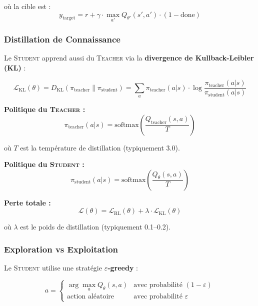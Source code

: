 \documentclass[12pt,a4paper]{article}
\newcommand{\teacher}{\textsc{Teacher}}
\newcommand{\student}{\textsc{Student}}
\begin{document}
où la cible est :
\begin{equation}
y_{\text{target}} = r + \gamma \cdot \max_{a'} Q_{\theta'}(s', a') \cdot (1 - \text{done})
\end{equation}

\subsubsection{Distillation de Connaissance}

Le \student{} apprend aussi du \teacher{} via la \textbf{divergence de Kullback-Leibler (KL)} :

\begin{equation}
\mathcal{L}_{\text{KL}}(\theta) = D_{\text{KL}}(\pi_{\text{teacher}} \| \pi_{\text{student}}) = \sum_a \pi_{\text{teacher}}(a|s) \cdot \log\frac{\pi_{\text{teacher}}(a|s)}{\pi_{\text{student}}(a|s)}
\end{equation}

\textbf{Politique du \teacher{} :}
\begin{equation}
\pi_{\text{teacher}}(a|s) = \text{softmax}\left(\frac{Q_{\text{teacher}}(s, a)}{T}\right)
\end{equation}

où $T$ est la température de distillation (typiquement 3.0).

\textbf{Politique du \student{} :}
\begin{equation}
\pi_{\text{student}}(a|s) = \text{softmax}\left(\frac{Q_\theta(s, a)}{T}\right)
\end{equation}

\textbf{Perte totale :}
\begin{equation}
\mathcal{L}(\theta) = \mathcal{L}_{\text{RL}}(\theta) + \lambda \cdot \mathcal{L}_{\text{KL}}(\theta)
\end{equation}

où $\lambda$ est le poids de distillation (typiquement 0.1--0.2).

\subsubsection{Exploration vs Exploitation}

Le \student{} utilise une stratégie \textbf{$\varepsilon$-greedy} :

\begin{equation}
a = \begin{cases}
\arg\max_a Q_\theta(s, a) & \text{avec probabilité } (1 - \varepsilon) \\
\text{action aléatoire} & \text{avec probabilité } \varepsilon
\end{cases}
\end{equation}
\end{document}
